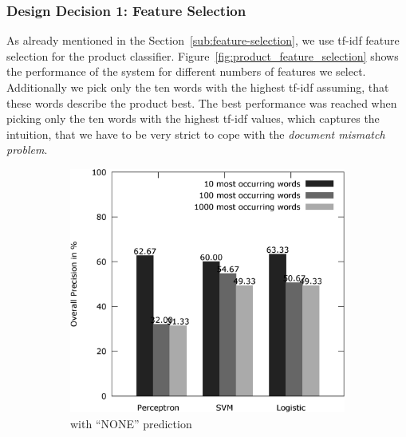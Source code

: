 \subsubsection{Design Decision 1: Feature Selection}
As already mentioned in the Section~\ref{sub:feature-selection}, we use tf-idf feature selection for the product classifier.
Figure~\ref{fig:product_feature_selection} shows the performance of the system for different numbers of features we select.
Additionally we pick only the ten words with the highest tf-idf assuming, that these words describe the product best.
The best performance was reached when picking only the ten words with the highest tf-idf values, which captures the intuition, that we have to be very strict to cope with the \emph{document mismatch problem}.
\begin{figure}[h!]
	\centering
	\begin{subfigure}[t]{0.5\textwidth}
		\includegraphics[width=\textwidth]{figures/product_feature_selection_with_none.eps}
		\caption{with ``NONE'' prediction}
	\end{subfigure}~
	\begin{subfigure}[t]{0.5\textwidth}

\end{subfigure}
\end{figure}
